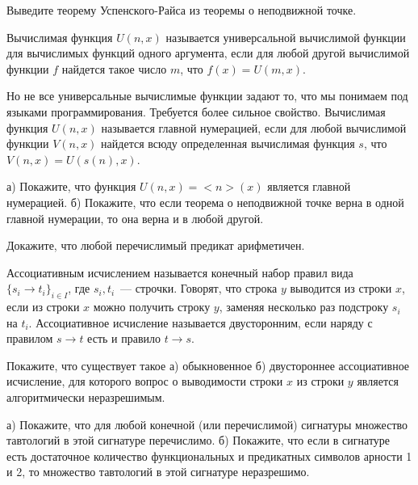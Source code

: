 \setcounter{curtask}{21}



\begin{task}
	Выведите теорему Успенского-Райса из теоремы о неподвижной точке.
\end{task}


Вычислимая функция $U(n,x)$ называется универсальной вычислимой функции для вычислимых функций одного аргумента, если для любой
другой вычислимой функции $f$ найдется такое число $m$, что $f(x) = U(m, x)$. 

Но не все универсальные вычислимые функции задают то, что мы понимаем под языками программирования. Требуется более сильное
свойство. Вычислимая функция $U(n, x)$ называется главной нумерацией, если для любой вычислимой функции $V(n, x)$ найдется всюду
определенная вычислимая функция $s$, что $V(n, x) = U(s(n), x)$.  

\begin{task}
	а) Покажите, что функция $U(n,x) = {<}n{>}(x)$ является главной нумерацией. б) Покажите, что если теорема о неподвижной точке
    верна в одной главной нумерации, то она верна и в любой другой.
\end{task}

\begin{task}
	Докажите, что любой перечислимый предикат арифметичен. 
\end{task}


Ассоциативным исчислением называется конечный набор правил вида $\{s_i \to t_i\}_{i \in I}$, где $s_i, t_i$~--- строчки. Говорят,
что строка $y$ выводится из строки $x$, если из строки $x$ можно получить строку $y$, заменяя несколько раз подстроку $s_i$ на
$t_i$. Ассоциативное исчисление называется двусторонним, если наряду с правилом $s \to t$ есть и правило $t \to s$.

\begin{task}
	Покажите, что существует такое а) обыкновенное б) двустороннее ассоциативное исчисление, для которого вопрос о выводимости
    строки $x$ из строки $y$ является алгоритмически неразрешимым. 
\end{task}

\begin{task}
	а) Покажите, что для любой конечной (или перечислимой) сигнатуры множество тавтологий в этой сигнатуре перечислимо. б)
    Покажите, что если в сигнатуре есть достаточное количество функциональных и предикатных символов арности 1 и 2, то множество
    тавтологий в этой сигнатуре неразрешимо.
\end{task}

